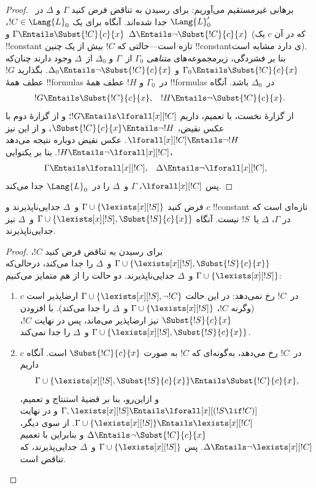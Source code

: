 \documentclass[../../../include/open-logic-section]{subfiles}
\begin{document}
\begin{proof}
برهانی غیرمستقیم می‌آوریم: برای رسیدن به تناقض فرض کنید $\Gamma$ و
$\Delta$ در~$\Lang{L}'_0$ جدا شده‌اند. آنگاه برای یک
$!C \in \Lang{L}_0$، $\Gamma \Entails \Subst{!C}{c}{x}$ و
$\Delta \Entails \lnot \Subst{!C}{c}{x}$ (که در آن $c$ یک
!!{constant} تازه است---حالتی که $!C$ بیش از یک چنین !!{constant}ی
دارد مشابه است). بنا بر فشردگی، زیرمجموعه‌های \emph{متناهی}
$\Gamma_0$ از~$\Gamma$ و $\Delta_0$ از~$\Delta$ وجود دارند چنان‌که
$\Gamma_0 \Entails \Subst{!C}{c}{x}$ و
$\Delta_0 \Entails \lnot \Subst{!C}{c}{x}$. بگذارید $!G$ عطف همهٔ
!!{formula}s در~$\Gamma_0$ و $!H$ عطف همهٔ !!{formula}s در~$\Delta_0$
باشد. آنگاه
\begin{align*}
  !G & \Entails \Subst{!C}{c}{x}, & !H  \Entails \lnot \Subst{!C}{c}{x}.
\end{align*}
از گزارهٔ نخست، با تعمیم، داریم $!G \Entails \lforall[x][!C]$؛ و از
گزارهٔ دوم با عکس نقیض، $\Subst{!C}{c}{x} \Entails \lnot !H$، و از
این نیز $\lforall[x][!C] \Entails \lnot !H$. عکس نقیض دوباره نتیجه
می‌دهد $!H \Entails \lnot \lforall[x][!C]$. بنا بر یکنوایی،
\begin{align*}
  \Gamma &\Entails \lforall[x][!C], &
  \Delta & \Entails \lnot \lforall[x][!C],
\end{align*}
پس $\lforall[x][!C]$، $\Gamma$ و~$\Delta$ را در~$\Lang{L}_0$ جدا
می‌کند.
\end{proof}

\begin{lem}
فرض کنید $\Gamma \cup \{ \lexists[x][!S] \}$ و~$\Delta$
جدایی‌ناپذیرند و $c$ !!{constant} تازه‌ای است که در $\Gamma$،
$\Delta$ یا~$!S$ نیست. آنگاه
$\Gamma \cup \{ \lexists[x][!S], \Subst{!S}{c}{x} \}$ و~$\Delta$
نیز جدایی‌ناپذیرند.
\end{lem}

\begin{proof}
برای رسیدن به تناقض فرض کنید $!C$،
$\Gamma \cup \{\lexists[x][!S], \Subst{!S}{c}{x}\}$ و~$\Delta$ را
جدا می‌کند، درحالی‌که $\Gamma \cup \{\lexists[x][!S] \}$ و~$\Delta$
جدایی‌ناپذیرند. دو حالت را از هم متمایز می‌کنیم:
\begin{enumerate}
\item $c$ در~$!C$ رخ نمی‌دهد: در این حالت
  $\Gamma \cup \{\lexists[x][!S], \lnot!C \}$ ارضاپذیر است (وگرنه
  $!C$، $\Gamma \cup \{\lexists[x][!S] \}$ و~$\Delta$ را جدا
  می‌کند). با افزودن $\Subst{!S}{c}{x}$ نیز ارضاپذیر می‌ماند، پس در
  نهایت $!C$،
  $\Gamma \cup \{ \lexists[x][!S], \Subst{!S}{c}{x} \}$ و~$\Delta$
  را جدا نمی‌کند.
\item $c$ در~$!C$ رخ می‌دهد، به‌گونه‌ای که $!C$ به صورت
  $\Subst{!C}{c}{x}$ است. آنگاه داریم
  \[
  \Gamma \cup \{ \lexists[x][!S], \Subst{!S}{c}{x}\} \Entails \Subst{!C}{c}{x},
  \]
  و ازاین‌رو، بنا بر قضیهٔ استنتاج و تعمیم،
  $\Gamma, \lexists[x][!S] \Entails \lforall[x][(!S \lif !C)]$ و در
  نهایت $\Gamma \cup \{ \lexists[x][!S] \} \Entails
  \lexists[x][!C]$. از سوی دیگر،
  $\Delta \Entails \lnot \Subst{!C}{c}{x}$ و بنابراین با تعمیم
  $\Delta \Entails \lnot \lexists[x][!C]$. پس
  $\Gamma \cup \{\lexists[x][!S] \}$ و~$\Delta$ جدایی‌پذیرند، که
  تناقض است.
\end{enumerate}
\end{proof}
\end{document}
